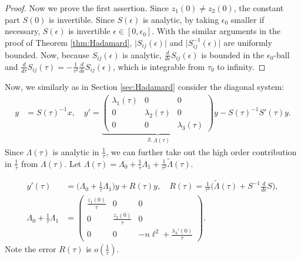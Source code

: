 \documentclass[a4paper,11pt]{article}
\def\l{{\ell}}
\theoremstyle{remark}
\begin{document}
\begin{proof}
Now we prove the first assertion. Since $z_1(0)\ne z_2(0)$, the constant part $S(0)$ is invertible. Since $S(\epsilon)$ is analytic, by taking $\epsilon_0$ smaller if necessary, $S(\epsilon)$ is invertible $\epsilon\in[0,\epsilon_0]$. With the similar arguments in the proof of Theorem \ref{thm:Hadamard}, $\big|S_{ij}(\epsilon)\big|$ and $\big|S^{-1}_{ij}(\epsilon)\big|$ are uniformly bounded.
Now, because $S_{ij}(\epsilon)$ is analytic, $\frac{d}{d\epsilon}S_{ij}(\epsilon)$ is bounded in the $\epsilon_0$-ball and $\frac{d}{d\tau} S_{ij}(\tau) = -\frac{1}{\tau^2}\frac{d}{d\epsilon} S_{ij}(\epsilon)$, which is integrable from $\tau_0$ to infinity. %
\end{proof}

Now, we similarly as in Section \ref{sec:Hadamard} consider the diagonal system:
\begin{equation*}
\begin{aligned}
 y &= S(\tau)^{-1} x, \quad  y' = \underbrace{\begin{pmatrix} \lambda_1(\tau) & 0 & 0\\0 & \lambda_2(\tau) & 0\\0 & 0 & \lambda_3(\tau)\end{pmatrix}}_{\triangleq \Lambda(\tau)} y - S(\tau)^{-1}S'(\tau) y.
\end{aligned}
\end{equation*}
Since $\Lambda(\tau)$ is analytic in $\frac{1}{\tau}$, we can further take out the high order contribution in $\frac{1}{\tau}$ from $\Lambda(\tau)$. Let $\Lambda(\tau) = \Lambda_0 + \frac{1}{\tau}\Lambda_1 + \frac{1}{\tau^2}\tilde{\Lambda}(\tau)$.

\begin{equation}\label{eq:diagonalsystem}
\begin{aligned}
y'(\tau) &= \Big(\Lambda_0 + \frac{1}{\tau}\Lambda_1\Big) y + R(\tau) y, \quad R(\tau) = \frac{1}{\tau^2}\Big(\tilde{\Lambda}(\tau)+ S^{-1}\frac{d}{d\epsilon}{S}\Big), \\
 \Lambda_0 + \frac{1}{\tau}\Lambda_1 &=
 \begin{pmatrix}
  \frac{z_1(0)}{\tau} & 0 & 0\\
  0 & \frac{z_2(0)}{\tau} & 0\\
  0 & 0 & -n\l^2 + \frac{\lambda_3'(0)}{\tau}
 \end{pmatrix}.
\end{aligned}
\end{equation}
Note the error $R(\tau)$ is $o(\frac{1}{\tau})$. %
\end{document}
